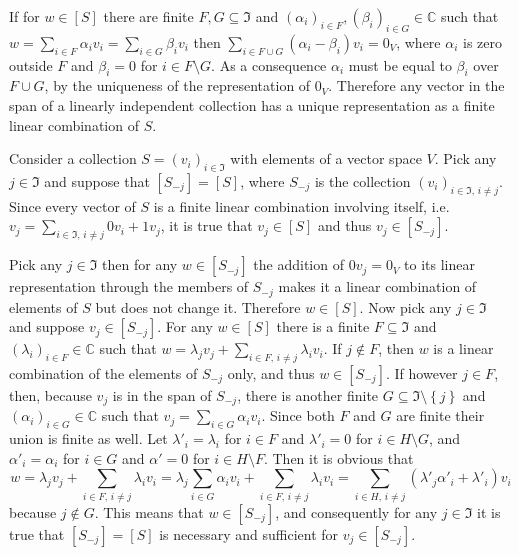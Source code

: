 \documentclass[a4paper]{article}
\newcommand{\obj}[1]{\ensuremath{\left\{ #1 \right\}}}
\newcommand{\brac}[1]{\ensuremath{\left( #1 \right)}}
\newcommand{\spn}[1]{\ensuremath{\left[ #1 \right]}}
\begin{document}
If for $w\in\spn{S}$ there are finite $F, G\subseteq \mathfrak{I}$ and $\brac{\alpha_i}_{i\in F}, \brac{\beta_i}_{i\in G}\in \mathbb{C}$ such that $w=\sum_{i\in F} \alpha_i v_i = \sum_{i\in G} \beta_i v_i$ then $\sum_{i\in F\cup G} (\alpha_i - \beta_i) v_i=0_V$, where $\alpha_i$ is zero outside $F$ and $\beta_i = 0$ for $i\in F\setminus G$. As a consequence $\alpha_i$ must be equal to $\beta_i$ over $F\cup G$, by the uniqueness of the representation of $0_V$. Therefore any vector in the span of a linearly independent collection has a unique representation as a finite linear combination of $S$.

Consider a collection $S=\brac{v_i}_{i\in\mathfrak{I}}$ with elements of a vector space $V$. Pick any $j\in\mathfrak{I}$ and suppose that $\spn{S_{-j}} = \spn{S}$, where $S_{-j}$ is the collection $\brac{v_i}_{i\in \mathfrak{I},\,i\neq j}$. Since every vector of $S$ is a finite linear combination involving itself, i.e. $v_j=\sum_{i\in\mathfrak{I},\,i\neq j} 0 v_i + 1 v_j$, it is true that $v_j\in \spn{S}$ and thus $v_j\in \spn{S_{-j}}$.

Pick any $j\in\mathfrak{I}$ then for any $w\in \spn{S_{-j}}$ the addition of $0 v_j = 0_V$ to its linear representation through the members of $S_{-j}$ makes it a linear combination of elements of $S$ but does not change it. Therefore $w\in \spn{S}$.
Now pick any $j\in\mathfrak{I}$ and suppose $v_j\in \spn{S_{-j}}$. For any $w \in \spn{S}$ there is a finite $F\subseteq\mathfrak{I}$ and $\brac{\lambda_i}_{i\in F}\in \mathbb{C}$ such that $w = \lambda_j v_j + \sum_{i\in F,\,i\neq j} \lambda_i v_i$. If $j\notin F$, then $w$ is a linear combination of the elements of $S_{-j}$ only, and thus $w\in \spn{S_{-j}}$.
If however $j\in F$, then, because $v_j$ is in the span of $S_{-j}$, there is another finite $G\subseteq \mathfrak{I}\setminus\obj{j}$ and $\brac{\alpha_i}_{i\in G} \in \mathbb{C}$ such that $v_j = \sum_{i\in G} \alpha_i v_i$. Since both $F$ and $G$ are finite their union is finite as well. Let $\lambda'_i=\lambda_i$ for $i\in F$ and $\lambda'_i=0$ for $i\in H\setminus G$, and $\alpha'_i=\alpha_i$ for $i\in G$ and $\alpha'=0$ for $i\in H\setminus F$. Then it is obvious that \[w = \lambda_j v_j + \sum_{i\in F,\,i\neq j} \lambda_i v_i = \lambda_j \sum_{i\in G} \alpha_i v_i + \sum_{i\in F,\,i\neq j} \lambda_i v_i = \sum_{i\in H,\,i\neq j} (\lambda'_j \alpha'_i + \lambda'_i) v_i\] because $j \notin G$. This means that $w \in \spn{S_{-j}}$, and consequently for any $j\in\mathfrak{I}$ it is true that $\spn{S_{-j}} = \spn{S}$ is necessary and sufficient for $v_j \in \spn{S_{-j}}$.
\end{document}
